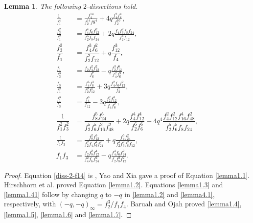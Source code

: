 \documentclass[12pt]{amsart}
\theoremstyle{plain}
\newtheorem{lemma}[theorem]{Lemma}
\theoremstyle{definition}
\begin{document}
\begin{lemma} \label{lemma1} The following $2$-dissections hold.
\begin{align}
\frac{1}{f_1^4} &= \frac{f_4^{14}}{f_2^{14}f8^4}+4q\frac{f_4^2f_8^4}{f_2^{10}},\label{diss-2-f14}\\
\frac{f_{3}^{2}}{f_{1}^{2}} &=\frac{f_{4}^{4}f_{6}f_{12}^{2}}{f_{2}^{5}f_{8}f_{24}}+2q\frac{f_{4}f_{6}^{2}f_{8}f_{24}}{f_{2}^{4}f_{12}}, \label{lemma1.1}\\
\dfrac{f_{3}^{3}}{f_{1}} &=\dfrac{f_{4}^{3}f_{6}^{2}}{f_{2}^{2}f_{12}}+q\dfrac{f_{12}^{3}}{f_{4}}, \label{lemma1.2}\\
\frac{f_{1}}{f_{3}^{3}} &=\frac{f_{2} f_{4}^{2} f_{12}^{2}}{f_{6}^{7}} -q \frac{f_{2}^{3} f_{12}^{6}}{f_{4}^{2} f_{6}^{9}}, \label{lemma1.3}\\
\frac{f_{3}}{f_{1}^{3}} &=\frac{f_{4}^{6} f_{6}^{3}}{f_{2}^{9} f_{12}^{2}} +3q \frac{f_{4}^{2} f_{6} f_{12}^{2}}{f_{2}^{7}}, \label{lemma1.4}\\
\frac{f_{1}^{3}}{f_{3}} &=\frac{f_{4}^{3}}{f_{12}} -3q \frac{f_{2}^{2} f_{12}^{3} }{ f_{4} f_{6}^{2}}, \label{lemma1.41}\\
\dfrac{1}{f_{1}^{2} f_{3}^{2}} &= \dfrac{f_{8}^{5} f_{24}^{5}}{f_{2}^{5} f_{6}^{5} f_{16}^{2} f_{48}^{2}} +2q \dfrac{f_{4}^{4} f_{12}^{4}}{f_{2}^{6} f_{6}^{6}} +4q^{4} \dfrac{f_{4}^{2} f_{12}^{2} f_{16}^{4} f_{48}^{2}}{f_{2}^{5} f_{6}^{5} f_{8} f_{24}}, \label{lemma1.5}\\
\frac{1}{f_{1} f_{3}} &= \frac{f_{8}^{2} f_{12}^{5}}{f_{2}^{2} f_{4} f_{6}^{4} f_{24}^{2}}+q \frac{f_{4}^{5} f_{24}^{2}}{f_{2}^{4} f_{6}^{2} f_{8}^{2} f_{12}},\label{lemma1.6}\\
f_{1}f_{3} &= \frac{f_{2} f_{8}^{2} f_{12}^{4}}{f_{4}^{2} f_{6} f_{24}^{2}}-q \frac{f_{4}^{4} f_{6} f_{24}^{2}}{f_{2} f_{8}^{2} f_{12}^{2}}. \label{lemma1.7}
\end{align}
\end{lemma}

\begin{proof}
Equation \eqref{diss-2-f14} is \cite[Lemma 2.2]{SellersJMAA}, Yao and Xia \cite{XiaYao2013} gave a proof of Equation \eqref{lemma1.1}. Hirschhorn et al. \cite{HirschhornGarvanBorwein1993} proved  Equation \eqref{lemma1.2}. Equations \eqref{lemma1.3} and \eqref{lemma1.41} follow by changing $q$ to $-q$ in \eqref{lemma1.2} and \eqref{lemma4.1}, respectively, with $(-q,-q)_{\infty}=f_{2}^{3}/f_{1}f_{4}$. Baruah and Ojah \cite{BaruahOjah2012, BaruahOjah2015} proved \eqref{lemma1.4}, \eqref{lemma1.5}, \eqref{lemma1.6} and \eqref{lemma1.7}.
\end{proof}
\end{document}
